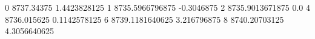 0 8737.34375 1.4423828125
1 8735.5966796875 -0.3046875
2 8735.9013671875 0.0
4 8736.015625 0.1142578125
6 8739.1181640625 3.216796875
8 8740.20703125 4.3056640625
